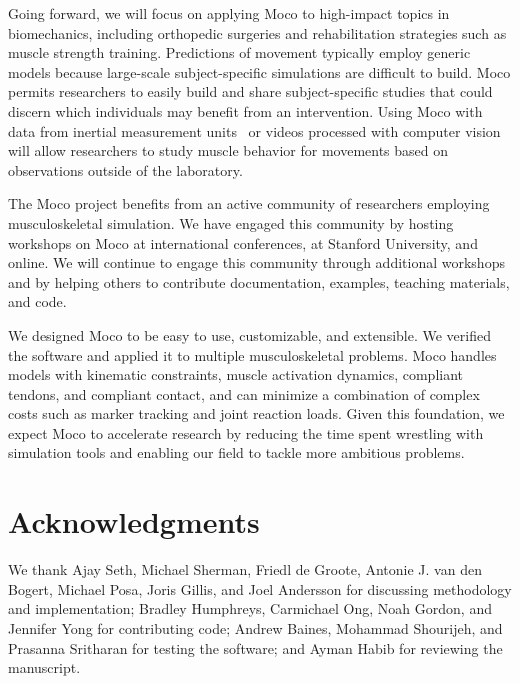\documentclass[10pt,letterpaper]{article}
\providecommand{\DIFaddbegin}{} %
\newcommand{\DIFaddincludegraphics}[2][]{{\color{blue}\fbox{\DIFOincludegraphics[#1]{#2}}}} %
\DeclareRobustCommand{\DIFaddbegin}{\DIFOaddbegin \let\includegraphics\DIFaddincludegraphics} %
\begin{document}
Going forward, we will focus on applying Moco to high-impact topics in biomechanics, including orthopedic surgeries and rehabilitation strategies such as muscle strength training. Predictions of movement typically employ generic models because large-scale subject-specific simulations are difficult to build. Moco permits researchers to easily build and share subject-specific studies that could discern which individuals may benefit from an intervention. Using Moco with data from inertial measurement units~\cite{Dorschky:2019} or videos processed with computer vision~\cite{OpenPose:2019} will allow researchers to study muscle behavior for movements based on observations outside of the laboratory.

The Moco project benefits from an active community of researchers employing musculoskeletal simulation. We have engaged this community by hosting workshops on Moco at international conferences, at Stanford University, and online. We will continue to engage this community through additional workshops and by helping others to contribute documentation, examples, teaching materials, and code.

We designed Moco to be easy to use, customizable, and extensible. We verified the software and applied it to multiple musculoskeletal problems. Moco handles models with kinematic constraints, muscle activation dynamics, compliant tendons, and compliant contact, and can minimize a combination of complex costs such as marker tracking and joint reaction loads. Given this foundation, we expect Moco to accelerate research by reducing the time spent wrestling with simulation tools and enabling our field to tackle more ambitious problems.

\section*{Acknowledgments}

We thank Ajay Seth, Michael Sherman, Friedl de Groote, Antonie J. van den Bogert, Michael Posa, Joris Gillis, and Joel Andersson for discussing methodology and implementation; Bradley Humphreys, Carmichael Ong, Noah Gordon, and Jennifer Yong for contributing code; Andrew Baines, Mohammad Shourijeh, and Prasanna Sritharan for testing the software; and Ayman Habib for reviewing the manuscript.

\DIFaddbegin \nolinenumbers

\end{document}
